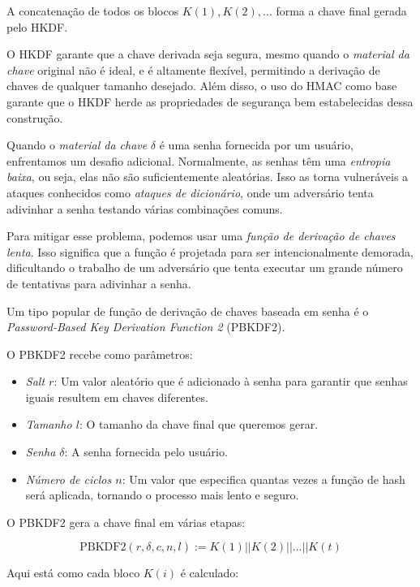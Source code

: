 A concatenação de todos os blocos $K(1), K(2), \dots$ forma a chave final gerada pelo HKDF.

O HKDF garante que a chave derivada seja segura, mesmo quando o \textit{material da chave} original não é ideal, e é altamente flexível, permitindo a derivação de chaves de qualquer tamanho desejado.
Além disso, o uso do HMAC como base garante que o HKDF herde as propriedades de segurança bem estabelecidas dessa construção.


Quando o \textit{material da chave} $\delta$ é uma senha fornecida por um usuário, enfrentamos um desafio adicional.
Normalmente, as senhas têm uma {\em entropia baixa}, ou seja, elas não são suficientemente aleatórias.
Isso as torna vulneráveis a ataques conhecidos como {\em ataques de dicionário}, onde um adversário tenta adivinhar a senha testando várias combinações comuns.

Para mitigar esse problema, podemos usar uma {\em função de derivação de chaves lenta}.
Isso significa que a função é projetada para ser intencionalmente demorada, dificultando o trabalho de um adversário que tenta executar um grande número de tentativas para adivinhar a senha.

Um tipo popular de função de derivação de chaves baseada em senha é o {\em Password-Based Key Derivation Function 2} (PBKDF2).

O PBKDF2 recebe como parâmetros:
\begin{itemize}
    \item[] {\em Salt $r$}: Um valor aleatório que é adicionado à senha para garantir que senhas iguais resultem em chaves diferentes.
    \item[] {\em Tamanho $l$}: O tamanho da chave final que queremos gerar.
    \item[] {\em Senha $\delta$}: A senha fornecida pelo usuário.
    \item[] {\em Número de ciclos $n$}: Um valor que especifica quantas vezes a função de hash será aplicada, tornando o processo mais lento e seguro.
\end{itemize}

O PBKDF2 gera a chave final em várias etapas:

\begin{displaymath}
  \text{PBKDF2}(r, \delta, c, n, l) := K(1) || K(2) || \dots || K(t)
\end{displaymath}

Aqui está como cada bloco $K(i)$ é calculado:

